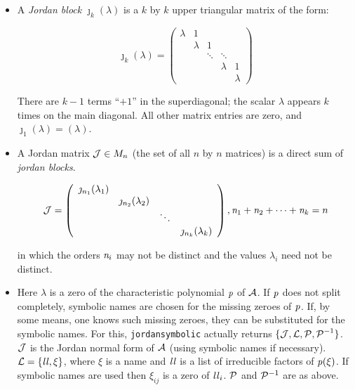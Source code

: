 \begin{itemize}
\item A {\it Jordan block} ${\jmath}_{k}(\lambda)$ is a $k$ by $k$ 
      upper triangular matrix of the form:

      \begin{displaymath}
      {\jmath}_{k}(\lambda) = \left( \begin{array}{ccccc} \lambda & 1 
      &  &  & \\  &  \lambda & 1  & & \\ & 
      & \ddots & \ddots & \\ &  &  &  \lambda & 1 \\ &
      &  &  & \lambda \end{array} \right) 
      \end{displaymath}
      
      There are $k-1$ terms ``$+1$'' in the superdiagonal; the scalar 
      $\lambda$ appears $k$ times on the main diagonal. All other 
      matrix entries are zero, and ${\jmath}_{1}(\lambda) = (\lambda)$.

\item A Jordan matrix ${\cal J} \in M_{n}$ (the set of all $n$ by $n$ 
      matrices) is a direct sum of {\it jordan blocks}.

      \begin{displaymath}
      {\cal J} = \left( \begin{array}{cccc} \jmath_{n_1}(\lambda_{1}) 
      \\  & \jmath_{n_2}(\lambda_{2}) \\ & & \ddots \\ & & & 
      \jmath_{n_k}(\lambda_{k}) \end{array} \right),
      {\it n}_{1}+{\it n}_{2}+\cdots +{\it n}_{k} = n
      \end{displaymath}

      in which the orders ${\it n}_{i}$ may not be distinct and the 
      values ${\lambda_{i}}$ need not be distinct.

\item Here ${\lambda}$ is a zero of the characteristic polynomial 
      ${\it p}$ of ${\cal A}$. If ${\it p}$ does not split completely, 
      symbolic names are chosen for the missing zeroes of ${\it p}$.
      If, by some means, one knows such missing zeroes, they can be 
      substituted for the symbolic names. For this, 
      {\tt jordansymbolic} actually returns $\{ {\cal J,L,P,P}^{-1} \}$.
      ${\cal J}$ is the Jordan normal form of ${\cal A}$ (using 
      symbolic names if necessary). ${\cal L} = \{ {\it ll}, \xi \}$, 
      where $\xi$ is a name and ${\it ll}$ is a list of irreducible 
      factors of ${\it p}(\xi)$. If symbolic names are used then 
      ${\xi}_{ij}$ is a zero of ${\it ll}_{i}$. ${\cal P}$ and 
      ${\cal P}^{-1}$ are as above.
\end{itemize}      

